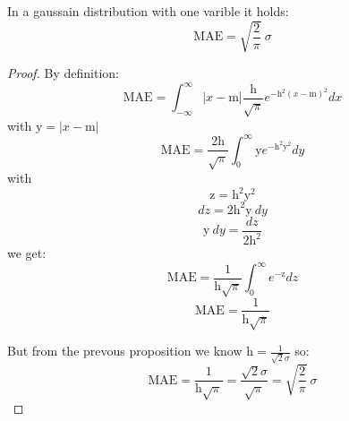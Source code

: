 \documentclass[11pt]{article}
\begin{document}
\begin{proposition}{}{}
    In a gaussain distribution with one varible it holds:
    \[
        \text{MAE} = \sqrt{\frac{2}{\pi}} \ \sigma
    \]
\end{proposition}
\begin{proof}
    By definition:
    \[
        \text{MAE}
        = \int_{-\infty}^{\infty} |x
          - \text{m}| \frac{\text{h}}{\sqrt{\pi}} e^{-\text{h}^2(x-\text{m})^2} dx
    \]
    with $\text{y} = |x - \text{m}|$
    \[
        \text{MAE} = \frac{2\text{h}}{\sqrt{\pi}} \int_{0}^{\infty} \text{y} e^{-\text{h}^2 \text{y}^2} dy
    \]
    with
    \[
        \text{z} = \text{h}^2 \text{y}^2
    \]
    \[
        dz = 2 \text{h}^2 \text{y} \ dy
    \]
    \[
        \text{y} \ dy = \frac{dz}{2 \text{h}^2}
    \]
    we get:
    \[
        \text{MAE} = \frac{1}{\text{h}\sqrt{\pi}} \int_{0}^{\infty} e^{-\text{z}} dz
    \]
    \[
        \text{MAE} = \frac{1}{\text{h}\sqrt{\pi}}
    \]

    But from the prevous proposition we know
    $\text{h} = \frac{1}{\sqrt{2} \sigma}$ so:
    \[
        \text{MAE} = \frac{1}{\text{h}\sqrt{\pi}}
                   = \frac{\sqrt{2} \sigma}{\sqrt{\pi}}
                   = \sqrt{\frac{2}{\pi}} \ \sigma
    \]

\end{proof}
\end{document}

